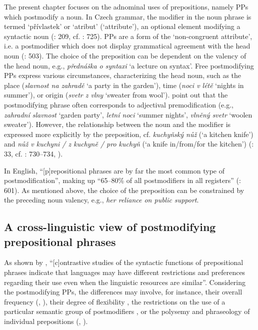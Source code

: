 \documentclass[output=paper]{langscibook}
\begin{document}
The present chapter focuses on the adnominal uses of prepositions, namely PPs which postmodify a noun.  In Czech grammar, the modifier in the noun phrase is termed ‘přívlastek’ or ‘atribut’ (‘attribute’), an optional element modifying a syntactic noun (\citealt{Dušková1999}: 209, cf. \citealt{ŠtíchaEtAl2013}: 725). PPs are a form of the ‘non-congruent attribute’, i.e. a postmodifier which does not display grammatical agreement with the head noun (\citealt{GreplEtAl1995}: 503). The choice of the preposition can be dependent on the valency of the head noun, e.g., \textit{přednáška o syntaxi} ‘a lecture on syntax’. Free postmodifying PPs express various circumstances, characterizing the head noun, such as the place (\textit{slavnost na zahradě} ‘a party in the garden’), time (\textit{noci v létě} ‘nights in summer’), or origin (\textit{svetr z vlny} ‘sweater from wool’). \citet[509]{GreplEtAl1995} point out that the postmodifying phrase often corresponds to adjectival premodification (e.g., \textit{zahradní slavnost} ‘garden party’, \textit{letní noci} ‘summer nights’, \textit{vlněný svetr} ‘woolen sweater’). However, the relationship between the noun and the modifier is expressed more explicitly by the preposition, cf. \textit{kuchyňský nůž} (‘a kitchen knife’) and \textit{nůž v kuchyni / z kuchyně / pro kuchyň} (‘a knife in/from/for the kitchen’) (\citealt{Čermák1996}: 33, cf. \citealt{ŠtíchaEtAl2013}: 730–734, \citealt{Karlík2017}).

In English, “[p]repositional phrases are by far the most common type of postmodification”, making up “65–80\% of all postmodifiers in all registers” (\citealt{BiberEtAl2021}: 601). As mentioned above, the choice of the preposition can be constrained by the preceding noun valency, e.g., \textit{her reliance on public support}.

\subsection{A cross-linguistic view of postmodifying prepositional phrases}

As shown by \citet[147]{Hasselgård2021}, “[c]ontrastive studies of the syntactic functions of prepositional phrases indicate that languages may have different restrictions and preferences regarding their use even when the linguistic resources are similar”. Considering the postmodifying PPs, the differences may involve, for instance, their overall frequency (\citealt{Dušková2015}, \citealt{Hasselgård2021}), their degree of flexibility \citep{Moreira-Rodrigues2006}, the restrictions on the use of a particular semantic group of postmodifiers \citep{Mott2013}, or the polysemy and phraseology of individual prepositions (\citealt{CosmeGilquin2008}, \citealt{Schmied1998}).
\end{document}
